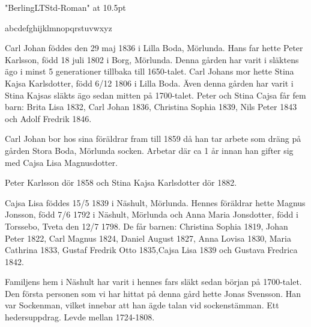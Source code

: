 

{\footline{}%

}

\font\berlinglt "BerlingLTStd-Roman" at 10.5pt\berlinglt

\noindent


\baselineskip

\smash{\centerline{\typosize[14/]\&}}

\baselineskip



\baselineskip

\hbox{abcdefghijklmnopqrstuvwxyz}


\noindent
Carl Johan föddes den 29 maj 1836 i Lilla Boda, Mörlunda. 
Hans far hette Peter Karlsson, född 18 juli 1802 i Borg, Mörlunda. 
Denna gården har varit i släktens ägo i minst 5 generationer tillbaka till 1650-talet. Carl Johans mor hette Stina Kajsa Karlsdotter, född 6/12 1806 i Lilla Boda. Även denna gården har varit i Stina Kajsas släkts ägo sedan mitten på 1700-talet.
Peter och Stina Cajsa får fem barn: Brita Lisa 1832, Carl Johan 1836, Christina Sophia 1839, Nils Peter 1843 och Adolf Fredrik 1846.

Carl Johan bor hos sina föräldrar fram till 1859 då han tar arbete som dräng på gården Stora Boda, Mörlunda socken. Arbetar där ca 1 år innan han gifter sig med Cajsa Lisa Magnusdotter.

Peter Karlsson dör 1858 och Stina Kajsa Karlsdotter dör 1882.



Cajsa Lisa föddes 15/5 1839 i Näshult, Mörlunda. Hennes föräldrar hette Magnus Jonsson, född 7/6 1792 i Näshult, Mörlunda och Anna Maria Jonsdotter, född i Torssebo, Tveta den 12/7 1798.
De får barnen: Christina Sophia 1819, Johan Peter 1822, Carl Magnus 1824, Daniel August 1827, Anna Lovisa 1830, Maria Cathrina 1833, Gustaf Fredrik Otto 1835,Cajsa Lisa 1839 och Gustava Fredrica 1842.
 
Familjens hem i Näshult har varit i hennes fars släkt sedan början på 1700-talet.
Den första personen som vi har hittat på denna gård hette Jonas Svensson. Han var Sockenman,  vilket innebar att han ägde talan vid sockenstämman. Ett hedersuppdrag.
Levde mellan 1724-1808.

